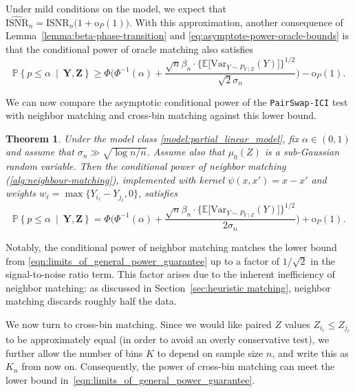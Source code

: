 \documentclass[12pt]{article}
\newtheorem{theorem}{Theorem}%
\newcommand{\PPst}[2]{\mathbb{P}\left\{{#1}\  \middle| \ {#2}\right\}}
\newcommand{\ISNR}{\mathrm{ISNR}}
\newcommand{\bY}{\mathbf{Y}}
\newcommand{\bZ}{\mathbf{Z}}
\begin{document}
Under mild conditions on the model, we expect that $\widehat{\ISNR}_n = \ISNR_n\bigl(1+\mathrm{o}_P(1)\bigr)$. With this approximation, another consequence of Lemma~\ref{lemma:beta-phase-transition} and \eqref{eq:asymptote-power-oracle-bounds} is that the conditional power of oracle matching also satisfies \begin{equation}\label{eqn:limits_of_general_power_guarantee}
      \PPst{p\leq\alpha}{\bY,\bZ} \geq \Phi\Biggl(\Phi^{-1}(\alpha)+\frac{\sqrt{n}\beta_n\cdot  \bigl\{\mathbb{E}\bigl[\mathrm{Var}_{Y\sim P_{Y\mid Z}}(Y)\bigr]\bigr\}^{1/2}}{\sqrt{2}\sigma_n}\Biggr)-\mathrm{o}_P(1).
\end{equation}

We can now compare the asymptotic conditional power of the \textnormal{\texttt{PairSwap-ICI}} test with neighbor matching and cross-bin matching against this lower bound.
\begin{theorem}\label{thm:neighbour_matching}
    Under the model class \eqref{model:partial_linear_model},  fix $\alpha\in(0,1)$ and assume that $\sigma_n\gg \sqrt{\log n/n}$. Assume also that $\mu_0(Z)$ is a sub-Gaussian random variable. Then the conditional power of neighbor matching (\cref{alg:neighbour-matching}), implemented with kernel $\psi(x,x')=x-x'$ and weights $w_\ell = \max\bigl\{Y_{i_\ell}-Y_{j_\ell},0\bigr\}$, satisfies 
    \[
   \PPst{p\leq\alpha}{\bY,\bZ}=\Phi\biggl(\Phi^{-1}(\alpha)+\frac{\sqrt{n}\beta_n\cdot  \bigl\{\mathbb{E}\bigl[\mathrm{Var}_{Y\sim P_{Y\mid Z}}(Y)\bigr]\bigr\}^{1/2}}{2\sigma_n}\biggr)+\mathrm{o}_P(1). 
    \]
\end{theorem}

Notably, the conditional power of neighbor matching matches the lower bound from \eqref{eqn:limits_of_general_power_guarantee} up to a factor of $1/\sqrt{2}$ in the signal-to-noise ratio term. This factor arises due to the inherent inefficiency of neighbor matching: as discussed in Section~\ref{sec:heuristic matching}, neighbor matching discards roughly half the data.

We now turn to cross-bin matching. Since we would like paired $Z$ values $Z_{i_\ell}\leq Z_{j_\ell}$ to be approximately equal (in order to avoid an overly conservative test), we further allow the number of bins $K$ to depend on sample size $n$, and write this as $K_n$ from now on.  Consequently, the power of cross-bin matching can meet the lower bound in~\eqref{eqn:limits_of_general_power_guarantee}.
\end{document}
